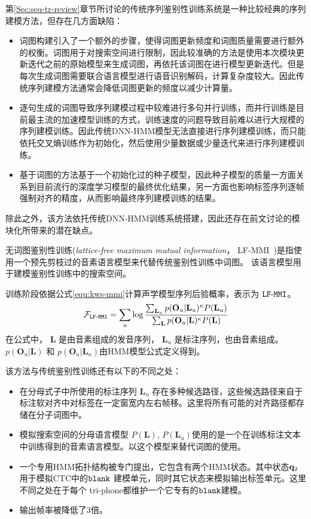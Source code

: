 第\ref{Sec:seq-tr-review}章节所讨论的传统序列鉴别性训练系统是一种比较经典的序列建模方法，但存在几方面缺陷：
\begin{itemize}
\item 词图构建引入了一个额外的步骤，使得词图更新频度和词图质量需要进行额外的权衡。词图用于对搜索空间进行限制，因此较准确的方法是使用本次模块更新迭代之前的原始模型来生成词图，再依托该词图在进行模型更新迭代。但是每次生成词图需要联合语言模型进行语音识别解码，计算复杂度较大。因此传统序列建模方法通常会降低词图更新的频度以减少计算量。
\item 逐句生成的词图导致序列建模过程中较难进行多句并行训练，而并行训练是目前最主流的加速模型训练的方式，训练速度的问题导致目前难以进行大规模的序列建模训练。因此传统DNN-HMM模型无法直接进行序列建模训练，而只能依托交叉熵训练作为初始化，然后使用少量数据或少量迭代来进行序列建模训练。
\item 基于词图的方法基于一个初始化过的种子模型，因此种子模型的质量一方面关系到目前流行的深度学习模型的最终优化结果，另一方面也影响标签序列逐帧强制对齐的精度，从而影响最终序列建模训练的结果。
\end{itemize}
除此之外，该方法依托传统DNN-HMM训练系统搭建，因此还存在前文讨论的模块化所带来的潜在缺点。


无词图鉴别性训练({\em lattice-free maximum mutual information}， LF-MMI~\cite{povey2016purely,chen2006advances})是指使用一个预先剪枝过的音素语言模型来代替传统鉴别性训练中词图。
该语言模型用于建模鉴别性训练中的搜索空间。

训练阶段依据公式\ref{equ:kws-mmi}计算声学模型序列后验概率，表示为 $\tt{LF\text{-}MMI}$。
\begin{equation}
\label{equ:kws-mmi}
\begin{split}
\mathcal{F}_{\tt{LF\text{-}MMI}}
=\sum_{u} \log \frac {\sum_{\mathbf{L}_u} p(\mathbf{O}_u|\mathbf{L}_u)^{\kappa}P(\mathbf{L}_u)}{\sum_{\mathbf{L}} p(\mathbf{O}_u|\mathbf{L})^{\kappa}P(\mathbf{L})}  
\end{split}
\end{equation}
在公式中， $\mathbf{L}$ 是由音素组成的发音序列， $\mathbf{L}_u$ 是标注序列，也由音素组成。
$p(\mathbf{O}_u|\mathbf{L})$ 和 $p(\mathbf{O}_u|\mathbf{L}_u)$由HMM模型公式定义得到。 


该方法与传统鉴别性训练还有以下的不同之处：
\begin{itemize}
\item 在分母式子中所使用的标注序列 $\mathbf{L}_u$ 存在多种候选路径，这些候选路径来自于标注软对齐中对标签在一定窗宽内左右帧移。这里将所有可能的对齐路径都存储在分子词图中。
\item 模拟搜索空间的分母语言模型 $P(\mathbf{L})$, $P(\mathbf{L}_u)$使用的是一个在训练标注文本中训练得到的音素语言模型。以这个模型来替代词图的使用。
\item 一个专用HMM拓扑结构被专门提出，它包含有两个HMM状态。其中状态${\bf q}_2$ 用于模拟CTC中的$\tt blank$ 建模单元，同时其它状态来模拟输出标签单元。这里不同之处在于每个 tri-phone都维护一个它专有的$\tt blank$建模。%
\item 输出帧率被降低了3倍。
\end{itemize}

